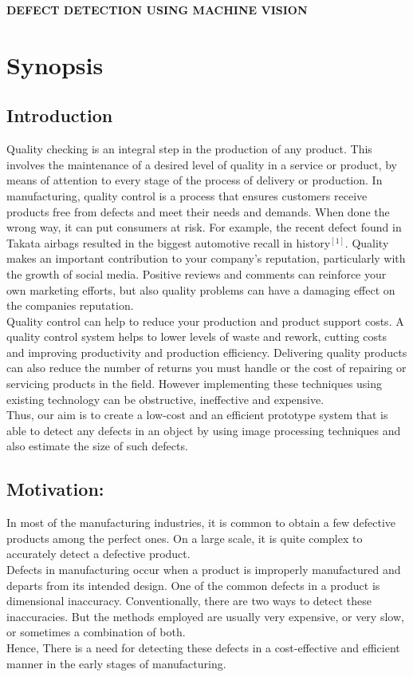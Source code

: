 \documentclass[12pt]{article}
\begin{document}
\begin{Large}
\begin{center}
\textbf{DEFECT DETECTION USING MACHINE VISION}
\end{center}
\end{Large}

\section{Synopsis}
\subsection{Introduction}
\quad Quality checking is an integral step in the production of any product. This involves the maintenance of a desired level of quality in a service or product, by means of attention to every stage of the process of delivery or production.  In manufacturing, quality control is a process that ensures customers receive products free from defects and meet their needs and demands. When done the wrong way, it can put consumers at risk. For example, the recent defect found in Takata airbags resulted in the biggest automotive recall in history$^{[1]}$. Quality makes an important contribution to your company’s reputation, particularly with the growth of social media. Positive reviews and comments can reinforce your own marketing efforts, but also quality problems can have a damaging effect on the companies reputation.\\
\null{\quad}Quality control can help to reduce your production and product support costs. A quality control system helps to lower levels of waste and rework, cutting costs and improving productivity and production efficiency. Delivering quality products can also reduce the number of returns you must handle or the cost of repairing or servicing products in the field. However implementing these techniques using existing technology can be obstructive, ineffective and expensive.\\

{\quad}Thus, our aim is to create a low-cost and an efficient prototype system that is able to detect any defects in an object by using image processing techniques and also estimate the size of such defects.

\subsection{Motivation:}
{\quad}In most of the manufacturing industries, it is common to obtain a few defective products among the perfect ones. On a large scale, it is quite complex to accurately detect a defective product.\\
\null{\quad}Defects in manufacturing occur when a product is improperly manufactured and departs from its intended design. One of the common defects in a product is dimensional inaccuracy. Conventionally, there are two ways to detect these inaccuracies. But the methods employed are usually very expensive, or very slow, or sometimes a combination of both.
\\
\null{\quad}Hence, There is a need for detecting these defects in a cost-effective and efficient manner in the early stages of manufacturing.
\end{document}
